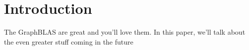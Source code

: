 %
%
\section{Introduction}
\label{sec:intro}
The GraphBLAS are great and you'll love them.  In this paper, we'll talk about the even greater stuff coming in the future